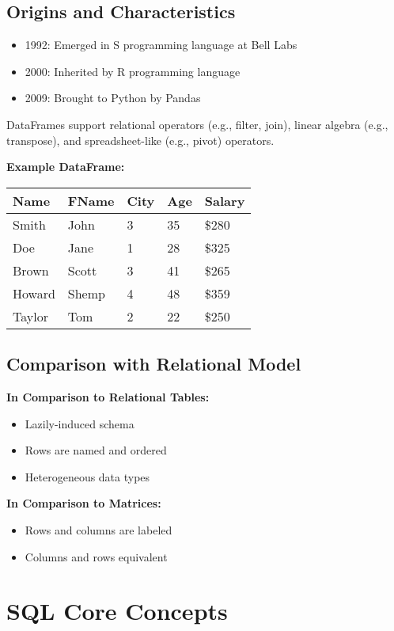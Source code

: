 \documentclass{article}
\begin{document}
\subsection*{Origins and Characteristics}
\begin{itemize}
    \item 1992: Emerged in S programming language at Bell Labs
    \item 2000: Inherited by R programming language
    \item 2009: Brought to Python by Pandas
\end{itemize}

DataFrames support relational operators (e.g., filter, join), linear algebra (e.g., transpose), and spreadsheet-like (e.g., pivot) operators.

\textbf{Example DataFrame:}
\begin{tabular}{lllll}
\hline
Name & FName & City & Age & Salary \\
\hline
Smith & John & 3 & 35 & \$280 \\
Doe & Jane & 1 & 28 & \$325 \\
Brown & Scott & 3 & 41 & \$265 \\
Howard & Shemp & 4 & 48 & \$359 \\
Taylor & Tom & 2 & 22 & \$250 \\
\hline
\end{tabular}

\subsection*{Comparison with Relational Model}
\textbf{In Comparison to Relational Tables:}
\begin{itemize}
    \item Lazily-induced schema
    \item Rows are named and ordered
    \item Heterogeneous data types
\end{itemize}

\textbf{In Comparison to Matrices:}
\begin{itemize}
    \item Rows and columns are labeled
    \item Columns and rows equivalent
\end{itemize}

\section*{SQL Core Concepts}
\end{document}
